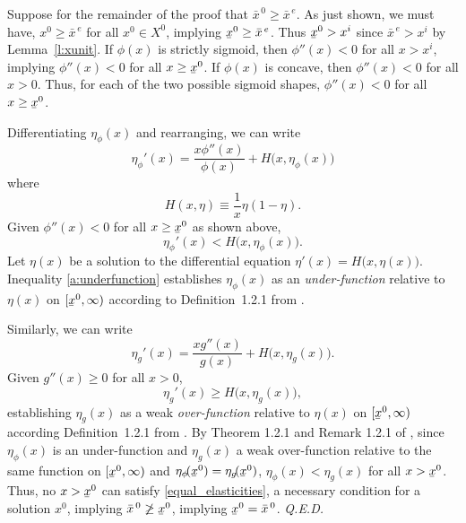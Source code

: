 \documentclass[12pt]{article}
\newcommand{\lowerbar}[1]{\underaccent{\bar}{#1}}
\renewcommand{\qed}{{\it Q.E.D.}}
\newcommand{\efficacy}{\phi}
\newcommand{\general}{g}
\newcommand{\xunitbar}{\bar{x}^{\,e}}
\newcommand{\xpoi}{x^{i}}
\newcommand{\xno}{x^{0}}
\newcommand{\Xno}{X^{0}}
\newcommand{\xnobar}{\bar{x}^{\,0}}
\newcommand{\xnolbar}{\lowerbar{x}^0}
\newcommand{\elasticity}[1]{\eta_{#1}}
\begin{document}
Suppose for the remainder of the proof that $\xnobar \geq
\xunitbar$. As just shown, we must have, $\xno \geq \xunitbar$ for all
$\xno \in \Xno$, implying $\xnolbar \geq \xunitbar$. Thus $\xnolbar >
\xpoi$ since $\xunitbar > \xpoi$ by Lemma~\ref{l:xunit}. If
$\efficacy(x)$ is strictly sigmoid, then $\efficacy''(x) < 0$ for all
$x > \xpoi$, implying $\efficacy''(x) < 0$ for all $x \geq
\xnolbar$. If $\efficacy(x)$ is concave, then $\efficacy''(x) < 0$ for
all $x > 0$. Thus, for each of the two possible sigmoid shapes,
$\efficacy''(x) < 0$ for all $x \geq \xnolbar$.

Differentiating $\elasticity{\efficacy}\!(x)$ and rearranging, we can
write
\begin{equation}
\label{a:deriv_elasticity_efficacy_H}
\elasticity{\efficacy}'\!(x) = \frac{x\efficacy''(x)}{\efficacy(x)} +
H \bigl( x,\elasticity{\efficacy}\!(x) \bigr)
\end{equation}
where
\begin{equation}
\label{a:H}
H(x,\eta) \equiv \frac{1}{x}\eta (1-\eta).
\end{equation}
Given $\efficacy''(x) < 0$ for all $x \geq \xnolbar$ as shown above, 
\begin{equation}
\label{a:underfunction}
\elasticity{\efficacy}'\!(x) < H \bigl( x, \elasticity{\efficacy}\!(x)
\bigr).
\end{equation} 
Let $\eta(x)$ be a solution to the differential equation $\eta'(x) = H
\bigl( x, \eta(x) \bigr)$. Inequality \eqref{a:underfunction}
establishes $\elasticity{\efficacy}\!(x)$ as an {\em under-function}
relative to $\eta(x)$ on $[\xnolbar, \infty)$ according to
  Definition~1.2.1 from \citet{Lakshmikantham1969}.

Similarly, we can write
\begin{equation}
\label{a:deriv_elasticity_general_H}
\elasticity{\general}'\!(x) = \frac{x\general''(x)}{\general(x)} + H
\bigl( x,\elasticity{\general}\!(x) \bigr).
\end{equation}
Given $\general''(x) \geq 0$ for all $x > 0$, 
\begin{equation}
\label{a:overfunction}
\elasticity{\general}'\!(x) \geq H \bigl( x, \elasticity{\general}(x)
\bigr),
\end{equation} 
establishing $\elasticity{\general}\!(x)$ as a weak {\em over-function}
relative to $\eta(x)$ on $[\xnolbar, \infty)$ according
  Definition~1.2.1 from \citet{Lakshmikantham1969}.  By Theorem 1.2.1 and Remark 1.2.1
  of \citet{Lakshmikantham1969}, since $\elasticity{\efficacy}\!(x)$
  is an under-function and $\elasticity{\general}\!(x)$ a weak
  over-function relative to the same function on $[\xnolbar,\infty)$
    and $\elasticity{\efficacy}\!(\xnolbar) =
    \elasticity{\general}\!(\xnolbar)$, $\elasticity{\efficacy}\!(x) <
    \elasticity{\general}\!(x)$ for all $x > \xnolbar$. Thus, no $x >
    \xnolbar$ can satisfy \eqref{equal_elasticities}, a necessary
    condition for a solution $\xno$, implying $\xnobar \not\geq
    \xnolbar$, implying $\xnolbar = \xnobar$. \qed
\end{document}

